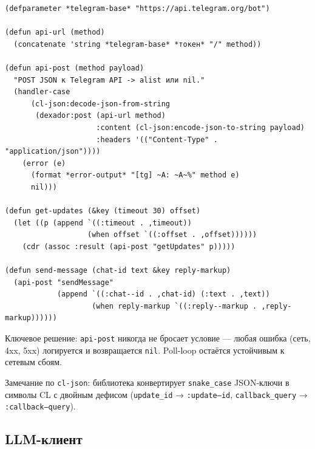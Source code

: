 \documentclass[11pt,a4paper]{article}
\begin{document}
\begin{lstlisting}[caption={мастер/cl/telegram.lisp}]
(defparameter *telegram-base* "https://api.telegram.org/bot")

(defun api-url (method)
  (concatenate 'string *telegram-base* *токен* "/" method))

(defun api-post (method payload)
  "POST JSON к Telegram API -> alist или nil."
  (handler-case
      (cl-json:decode-json-from-string
       (dexador:post (api-url method)
                     :content (cl-json:encode-json-to-string payload)
                     :headers '(("Content-Type" . "application/json"))))
    (error (e)
      (format *error-output* "[tg] ~A: ~A~%" method e)
      nil)))

(defun get-updates (&key (timeout 30) offset)
  (let ((p (append `((:timeout . ,timeout))
                   (when offset `((:offset . ,offset))))))
    (cdr (assoc :result (api-post "getUpdates" p)))))

(defun send-message (chat-id text &key reply-markup)
  (api-post "sendMessage"
            (append `((:chat--id . ,chat-id) (:text . ,text))
                    (when reply-markup `((:reply--markup . ,reply-markup))))))
\end{lstlisting}

Ключевое решение: \texttt{api-post} никогда не бросает условие — любая ошибка (сеть, 4xx, 5xx) логируется и возвращается \texttt{nil}. Poll-loop остаётся устойчивым к сетевым сбоям.

Замечание по \texttt{cl-json}: библиотека конвертирует \texttt{snake\_case} JSON-ключи в символы CL с двойным дефисом (\texttt{update\_id} → \texttt{:update--id}, \texttt{callback\_query} → \texttt{:callback--query}).

\subsection{LLM-клиент}
\end{document}
